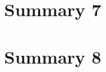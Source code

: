 \documentclass[12pt]{article} %
\begin{document}
\section{Summary 7} %

\section{Summary 8} %



\newpage

\nocite{*}


 

\end{document}
